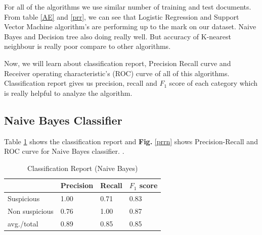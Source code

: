 For all of the algorithms we use similar number of training and test documents. From table \ref{AE} and \ref{prr}, we can see that Logistic Regression and Support Vector Machine algorithm's are performing up to the mark on our dataset. Naive Bayes and Decision tree also doing really well. But accuracy of K-nearest neighbour is really poor compare to other algorithms. 

Now, we will learn about classification report, Precision Recall curve and Receiver operating characteristic's (ROC) curve of  all of this algorithms. Classification report gives us precision, recall and $F_1$ score of each category which is really helpful to analyze the algorithm.
\subsection{\textbf{Naive Bayes Classifier}}
Table \ref{NBC} shows the classification report and \textbf{Fig.} \ref{prrn} shows Precision-Recall and ROC curve for Naive Bayes classifier.  .
\renewcommand{\arraystretch}{1.2}
\begin{table}[h!]
\begin{center}
\caption{Classification Report (Naive Bayes)}
\begin{tabular}{|m{2.8cm} | m{1.5cm}| m{1.3cm}| m{1.5cm}|}
\hline
     & Precision & Recall & $F_1$ score\\
\hline
     Suspicious & 1.00 & 0.71 & 0.83\\
\hline 
     Non suspicious  & 0.76 & 1.00 & 0.87\\
\hline 
     avg./total & 0.89 & 0.85 & 0.85\\
\hline
\end{tabular}
\label{NBC}
\end{center}
\end{table}

